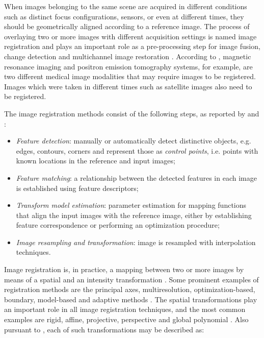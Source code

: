 When images belonging to the same scene are acquired in different conditions such as distinct focus configurations, sensors, or even at different times, they should be geometrically aligned according to a reference image. The process of overlaying two or more images with different acquisition settings is named image registration and plays an important role as a pre-processing step for image fusion, change detection and multichannel image restoration \cite{zitova2003image}. According to , magnetic resonance imaging and positron emission tomography systems, for example, are two different medical image modalities that may require images to be registered. Images which were taken in different times such as satellite images also need to be registered.

The image registration methods consist of the following steps, as reported by  and :

\begin{itemize}
    \item \emph{Feature detection}: manually or automatically detect distinctive objects, e.g. edges, contours, corners and represent those as \emph{control points}, i.e. points with known locations in the reference and input images;

    \item \emph{Feature matching}: a relationship between the detected features in each image is established using feature descriptors;

    \item \emph{Transform model estimation}: parameter estimation for mapping functions that align the input images with the reference image, either by establishing feature correspondence or performing an optimization procedure;

    \item \emph{Image resampling and transformation}: image is resampled with interpolation techniques.

\end{itemize}

Image registration is, in practice, a mapping between two or more images by means of a spatial and an intensity transformation \cite{brown1992survey}. Some prominent examples of registration methods are the principal axes, multiresolution, optimization-based, boundary, model-based and adaptive methods  \cite{goshtasby2012image}. The spatial transformations play an important role in all image registration techniques, and the most common examples are rigid, affine, projective, perspective and global polynomial \cite{brown1992survey}. Also pursuant to , each of such transformations may be described as:


